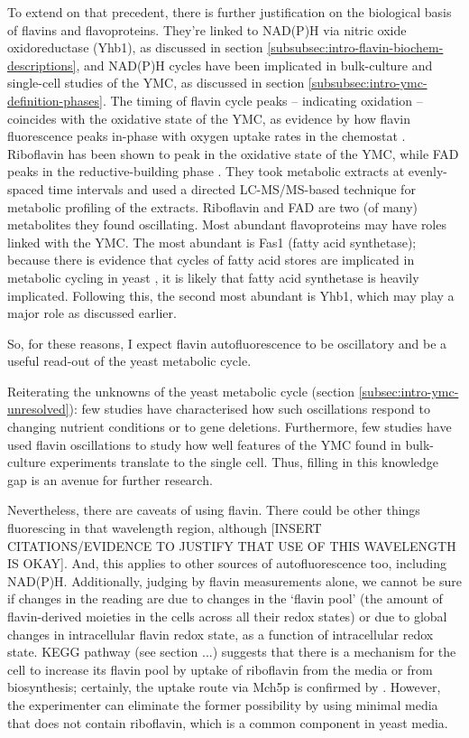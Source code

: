 To extend on that precedent, there is further justification on the biological basis of flavins and flavoproteins.
They're linked to NAD(P)H via nitric oxide oxidoreductase (Yhb1), as discussed in section \ref{subsubsec:intro-flavin-biochem-descriptions}, and NAD(P)H cycles have been implicated in bulk-culture \citep{tuLogicYeastMetabolic2005} %
and single-cell \citep{papagiannakisAutonomousMetabolicOscillations2017} studies of the YMC, as discussed in section \ref{subsubsec:intro-ymc-definition-phases}.
The timing of flavin cycle peaks -- indicating oxidation -- coincides with the oxidative state of the YMC, as evidence by how flavin fluorescence peaks in-phase with oxygen uptake rates in the chemostat \citep{murrayRedoxRegulationRespiring2011,sasidharanTimeStructureYeastMetabolism2012}.
Riboflavin has been shown to peak in the oxidative state of the YMC, while FAD peaks in the reductive-building phase \parencite{tuCyclicChangesMetabolic2007}.
They took metabolic extracts at evenly-spaced time intervals and used a directed LC-MS/MS-based technique for metabolic profiling of the extracts.
Riboflavin and FAD are two (of many) metabolites they found oscillating.
Most abundant flavoproteins may have roles linked with the YMC.
The most abundant is Fas1 (fatty acid synthetase); because there is evidence that cycles of fatty acid stores are implicated in metabolic cycling in yeast \citep{campbellBuildingBlocksAre2020}, it is likely that fatty acid synthetase is heavily implicated.
Following this, the second most abundant is Yhb1, which may play a major role as discussed earlier.

So, for these reasons, I expect flavin autofluorescence to be oscillatory and be a useful read-out of the yeast metabolic cycle.

Reiterating the unknowns of the yeast metabolic cycle (section \ref{subsec:intro-ymc-unresolved}):
few studies have characterised how such oscillations respond to changing nutrient conditions or to gene deletions.
Furthermore,
few studies have used flavin oscillations to study how well features of the YMC found in bulk-culture experiments translate to the single cell.
Thus, filling in this knowledge gap is an avenue for further research.

Nevertheless, there are caveats of using flavin.
There could be other things fluorescing in that wavelength region, although [INSERT CITATIONS/EVIDENCE TO JUSTIFY THAT USE OF THIS WAVELENGTH IS OKAY].
And, this applies to other sources of autofluorescence too, including NAD(P)H.
Additionally, judging by flavin measurements alone, we cannot be sure if changes in the reading are due to changes in the `flavin pool' (the amount of flavin-derived moieties in the cells across all their redox states) or due to global changes in intracellular flavin redox state, as a function of intracellular redox state.
KEGG pathway (see section ...) suggests that there is a mechanism for the cell to increase its flavin pool by uptake of riboflavin from the media or from biosynthesis; certainly, the uptake route via Mch5p is confirmed by \textcite{gudipatiFlavoproteomeYeastSaccharomyces2014}.
However, the experimenter can eliminate the former possibility by using minimal media that does not contain riboflavin, which is a common component in yeast media.

